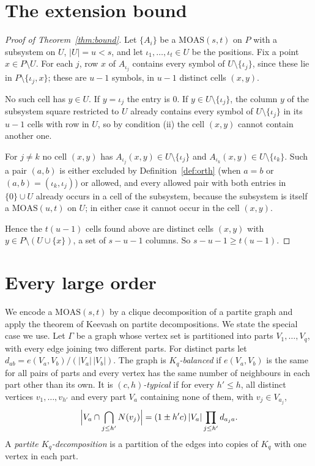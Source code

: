 \documentclass[11pt]{amsart}
\theoremstyle{definition}\newtheorem{definition}[theorem]{Definition}
\theoremstyle{remark}\newtheorem{remark}[theorem]{Remark}
\newcommand{\MOAS}{\mathrm{MOAS}}
\begin{document}
\section{The extension bound}\label{sec:bound}
\begin{proof}[Proof of Theorem~\ref{thm:bound}]
Let $\{A_i\}$ be a $\MOAS(s,t)$ on $P$ with a subsystem on $U$, $|U|=u<s$, and let $\iota_1,\dots,\iota_t\in U$ be the
positions. Fix a point $x\in P\setminus U$. For each $j$, row $x$ of $A_{\iota_j}$ contains every symbol of
$U\setminus\{\iota_j\}$, since these lie in $P\setminus\{\iota_j,x\}$; these are $u-1$ symbols, in $u-1$ distinct
cells $(x,y)$.

No such cell has $y\in U$. If $y=\iota_j$ the entry is $0$. If $y\in U\setminus\{\iota_j\}$, the column $y$ of the
subsystem square restricted to $U$ already contains every symbol of $U\setminus\{\iota_j\}$ in its $u-1$ cells with row
in $U$, so by condition (ii) the cell $(x,y)$ cannot contain another one.

For $j\ne k$ no cell $(x,y)$ has $A_{\iota_j}(x,y)\in U\setminus\{\iota_j\}$ and $A_{\iota_k}(x,y)\in U\setminus\{\iota_k\}$.
Such a pair $(a,b)$ is either excluded by Definition~\ref{def:orth} (when $a=b$ or $(a,b)=(\iota_k,\iota_j)$) or
allowed, and every allowed pair with both entries in $\{0\}\cup U$ already occurs in a cell of the subsystem, because
the subsystem is itself a $\MOAS(u,t)$ on $U$; in either case it cannot occur in the cell $(x,y)$.

Hence the $t(u-1)$ cells found above are distinct cells $(x,y)$ with $y\in P\setminus(U\cup\{x\})$, a set of $s-u-1$
columns. So $s-u-1\ge t(u-1)$.
\end{proof}

\section{Every large order}\label{sec:large}
We encode a $\MOAS(s,t)$ by a clique decomposition of a partite graph and apply the theorem of Keevash on partite
decompositions. We state the special case we use. Let $\Gamma$ be a graph whose vertex set is partitioned into parts
$V_1,\dots,V_q$, with every edge joining two different parts. For distinct parts let
$d_{ab}=e(V_a,V_b)/(|V_a|\,|V_b|)$. The graph is \emph{$K_q$-balanced} if $e(V_a,V_b)$ is the same for all pairs of
parts and every vertex has the same number of neighbours in each part other than its own. It is
\emph{$(c,h)$-typical} if for every $h'\le h$, all distinct vertices $v_1,\dots,v_{h'}$ and every part $V_a$ containing
none of them, with $v_j\in V_{a_j}$,
\[
\Bigl|V_a\cap\bigcap_{j\le h'}N(v_j)\Bigr|=(1\pm h'c)\,|V_a|\prod_{j\le h'}d_{a_ja}.
\]
A \emph{partite $K_q$-decomposition} is a partition of the edges into copies of $K_q$ with one vertex in each part.
\end{document}
